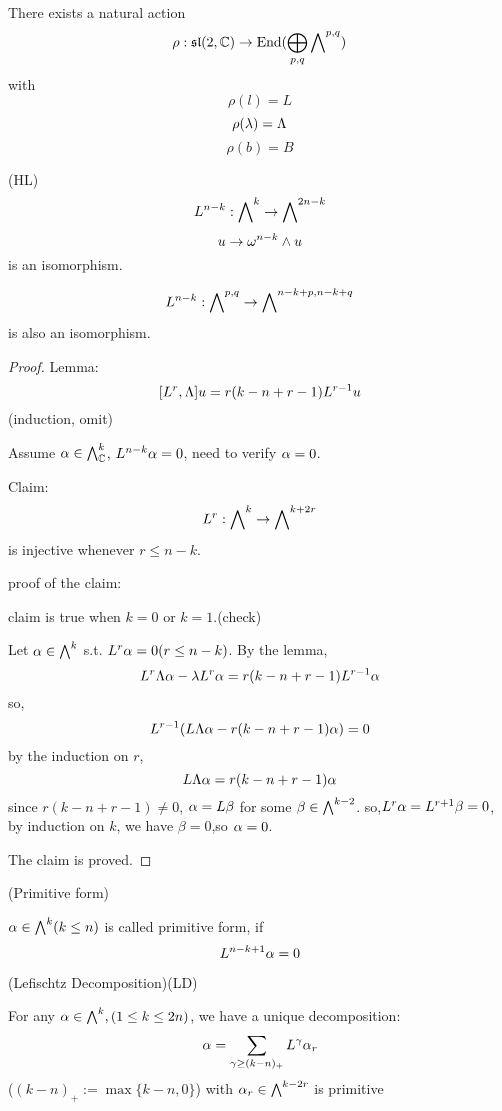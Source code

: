 \begin{prop}
There exists a natural action
$$\rho:\mathfrak{sl}(2,\mathbb{C})\to\operatorname{End}(\bigoplus_{p,q}\bigwedge\nolimits^{p,q})$$
with
$$\rho(l)=L$$
$$\rho(\lambda)=\Lambda$$
$$\rho(b)=B$$
\end{prop}

\begin{thm}(HL)
$$L^{n-k}:\bigwedge\nolimits^{k}\to\bigwedge\nolimits^{2n-k}$$
$$u\to\omega^{n-k}\wedge u$$
is an isomorphism.

$$L^{n-k}:\bigwedge\nolimits^{p,q}\to \bigwedge\nolimits^{n-k+p,n-k+q}$$
is also an isomorphism.
\end{thm}

\begin{proof}

Lemma:
$$[L^r,\Lambda]u=r(k-n+r-1)L^{r-1}u$$
(induction, omit)

Assume $\alpha\in\bigwedge\nolimits^{k}_{\mathbb{C}}$, $L^{n-k}\alpha=0$,
need to verify $\alpha=0$.

Claim:
$$L^r:\bigwedge\nolimits^{k}\to\bigwedge\nolimits^{k+2r}$$
is injective whenever $r\leq n-k$.

proof of the claim:

claim is true when $k=0$ or $k=1$.(check)

Let $\alpha\in \bigwedge\nolimits^{k}$ s.t. $L^r\alpha=0(r\leq n-k)$.
By the lemma,
$$L^r\Lambda\alpha-\lambda L^r\alpha=r(k-n+r-1)L^{r-1}\alpha$$
so,
$$L^{r-1}(L\Lambda\alpha-r(k-n+r-1)\alpha)=0$$
by the induction on $r$,
$$L\Lambda\alpha=r(k-n+r-1)\alpha$$
since $r(k-n+r-1)\neq 0$, $\alpha=L\beta$ for some $\beta\in\bigwedge\nolimits^{k-2}$.
so,$L^r\alpha=L^{r+1}\beta=0$, by induction on $k$, we have
$\beta=0$,so $\alpha=0$.

The claim is proved.
\end{proof}

\begin{definition}(Primitive form)

$\alpha\in\bigwedge\nolimits^{k}(k\leq n)$ is called primitive form, if
$$L^{n-k+1}\alpha=0$$
\end{definition}

\begin{cor}(Lefischtz Decomposition)(LD)

For any $\alpha\in\bigwedge\nolimits^{k},(1\leq k\leq 2n)$,
we have a unique decomposition:
$$
  \alpha
=
  \sum_{\gamma\geq(k-n)_+}
    L^\gamma\alpha_r
$$
($(k-n)_+:=\max\{k-n,0\}$)
with $\alpha_r\in\bigwedge\nolimits^{k-2r}$ is primitive
\end{cor}

